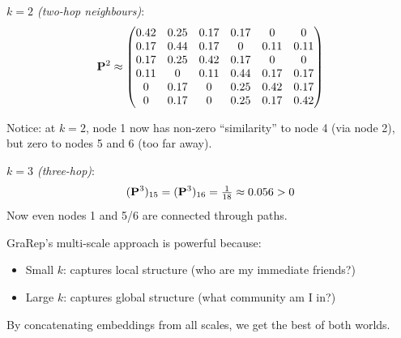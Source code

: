 \begin{notechapter}
\begin{example}
\emph{$k=2$ (two-hop neighbours)}:
\[
\mathbf{P}^2 \approx \begin{pmatrix}
0.42 & 0.25 & 0.17 & 0.17 & 0 & 0 \\
0.17 & 0.44 & 0.17 & 0 & 0.11 & 0.11 \\
0.17 & 0.25 & 0.42 & 0.17 & 0 & 0 \\
0.11 & 0 & 0.11 & 0.44 & 0.17 & 0.17 \\
0 & 0.17 & 0 & 0.25 & 0.42 & 0.17 \\
0 & 0.17 & 0 & 0.25 & 0.17 & 0.42
\end{pmatrix}
\]

Notice: at $k=2$, node 1 now has non-zero ``similarity'' to node 4 (via node 2), but zero to nodes 5 and 6 (too far away).

\emph{$k=3$ (three-hop)}:
\[
(\mathbf{P}^3)_{15} = (\mathbf{P}^3)_{16} = \tfrac1{18} \approx 0.056 > 0
\]
Now even nodes 1 and 5/6 are connected through paths.

\begin{center}
\end{center}
\end{example}

\begin{keyidea}
GraRep's multi-scale approach is powerful because:
\begin{itemize}
    \item Small $k$: captures local structure (who are my immediate friends?)
    \item Large $k$: captures global structure (what community am I in?)
\end{itemize}
By concatenating embeddings from all scales, we get the best of both worlds.
\end{keyidea}



\end{notechapter}
